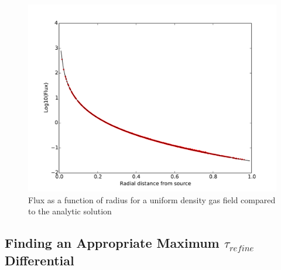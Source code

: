 \begin{figure} [H]
    \centering
    \includegraphics[width=\textwidth]{plots/CH4/thickFluxVr.pdf}
    \caption{Flux as a function of radius for a uniform density gas field compared to the analytic solution}
    \label{fig:uniformField}
\end{figure}

\subsection{Finding an Appropriate Maximum $\tau_{refine}$ Differential}

